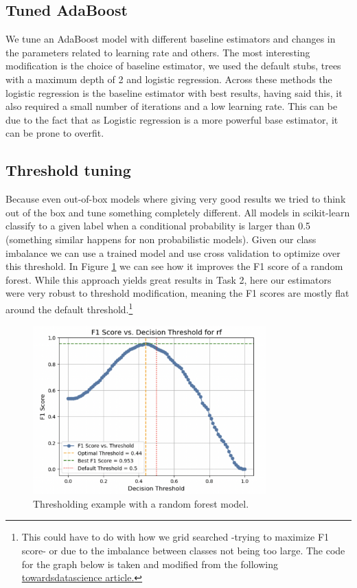 \documentclass{article}
\begin{document}
\subsection*{Tuned AdaBoost}
We tune an AdaBoost model with different baseline estimators and changes in the parameters related to learning rate and others.
The most interesting modification is the choice of baseline estimator, we used the default stubs, trees with a maximum depth of 2 and logistic regression. 
Across these methods the logistic regression is the baseline estimator with best results, having said this, it also required a small number of iterations and a low learning rate. 
This can be due to the fact that as Logistic regression is a more powerful base estimator, it can be prone to overfit.

\subsection*{Threshold tuning}
Because even out-of-box models where giving very good results we tried to think out of the box and tune something completely different.
All models in scikit-learn classify to a given label when a conditional probability is larger than 0.5 (something similar happens for non probabilistic models). 
Given our class imbalance we can use a trained model and use cross validation to optimize over this threshold. 
In Figure \ref{fig:thresh_rf} we can see how it improves the F1 score of a random forest. While this approach yields great results in Task 2, here our estimators were 
very robust to threshold modification, meaning the F1 scores are mostly flat around the default threshold.\footnote{
    This could have to do with how we grid searched -trying to maximize F1 score- or due to the imbalance between classes not being too large.
    The code for the graph below is taken and modified from the following \href{https://towardsdatascience.com/tune-in-decision-threshold-optimization-with-scikit-learns-tunedthresholdclassifiercv-7de558a2cf58}{towardsdatascience article.}
}
\begin{figure}[h]
    \centering
    \includegraphics[width=0.8\textwidth]{RF_THRESHOLD_DEF.png}
    \caption{Thresholding example with a random forest model.}\label{fig:thresh_rf}
\end{figure}
\end{document}
